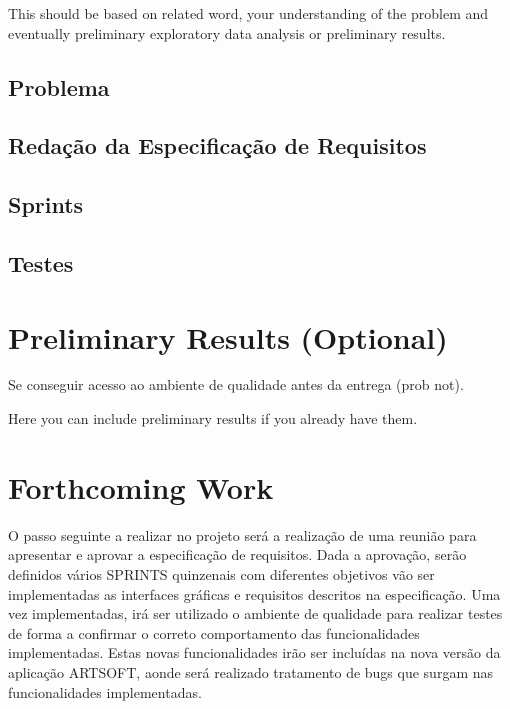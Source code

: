 \documentclass[sigplan]{acmart}
\begin{document}
This should be based on related word, your understanding of the problem and eventually preliminary exploratory data analysis or preliminary results.

\subsection{Problema} %

\subsection{Redação da Especificação de Requisitos}

\subsection{Sprints}

\subsection{Testes}

\section{Preliminary Results (Optional)} \label{sec:preliminaryresults}

Se conseguir acesso ao ambiente de qualidade antes da entrega (prob not).

Here you can include preliminary results if you already have them.

\section{Forthcoming Work} \label{sec:forthcomingwork}


O passo seguinte a realizar no projeto será a realização de uma reunião para apresentar e aprovar a especificação de requisitos. Dada a aprovação, serão definidos vários SPRINTS quinzenais com diferentes objetivos vão ser implementadas as interfaces gráficas e requisitos descritos na especificação. Uma vez implementadas, irá ser utilizado o ambiente de qualidade para realizar testes de forma a confirmar o correto comportamento das funcionalidades implementadas. Estas novas funcionalidades irão ser incluídas na nova versão da aplicação ARTSOFT, aonde será realizado tratamento de bugs que surgam nas funcionalidades implementadas.



\end{document}
